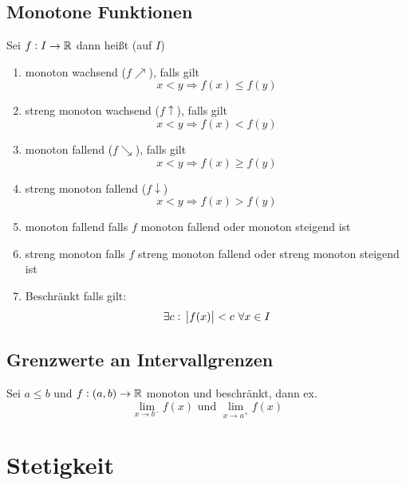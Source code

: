 \subsection{Monotone Funktionen}
Sei $f: I \rightarrow \mathbb{R}$ dann heißt (auf $I$)
\begin{enumerate}[label= (\alph*)]
    \item monoton wachsend ($f \nearrow$), falls gilt
        \begin{equation*}
            x < y \Rightarrow f(x) \leq f(y)
        \end{equation*}
    \item streng monoton wachsend ($f \uparrow$), falls gilt
        \begin{equation*}
            x < y \Rightarrow f(x) < f(y)
        \end{equation*}
    \item monoton fallend ($f \searrow$), falls gilt
        \begin{equation*}
            x < y \Rightarrow f(x) \geq f(y)
        \end{equation*}
    \item streng monoton fallend ($f \downarrow$)
        \begin{equation*}
            x < y \Rightarrow f(x) > f(y)
        \end{equation*}
    \item monoton fallend falls $f$ monoton fallend oder monoton steigend ist
    \item streng monoton falls $f$ streng monoton fallend oder streng monoton
        steigend ist
    \item Beschränkt falls gilt:
        \begin{equation*}
            \exists c:\ \abs{f(x)} < c\ \forall x \in I
        \end{equation*}
\end{enumerate}

\subsection{Grenzwerte an Intervallgrenzen}
Sei $a \leq b$ und $f: (a, b) \rightarrow \mathbb{R}$ monoton und beschränkt, dann
ex.
\begin{equation*}
    \lim_{x \rightarrow b^-} f(x) \text{ und } \lim_{x \rightarrow a^+} f(x)
\end{equation*}

\section{Stetigkeit}

